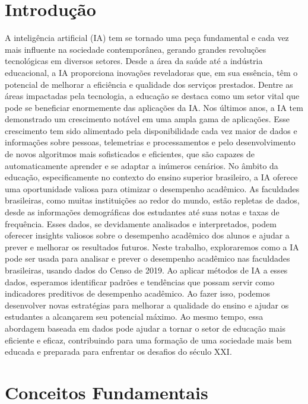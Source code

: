 \documentclass[conference]{IEEEtran}
\begin{document}
\section{Introdução}
A inteligência artificial (IA) tem se tornado uma peça fundamental e cada vez mais influente na sociedade contemporânea, gerando grandes revoluções tecnológicas em diversos setores. Desde a área da saúde até a indústria educacional, a IA proporciona inovações reveladoras que, em sua essência, têm o potencial de melhorar a eficiência e qualidade dos serviços prestados. Dentre as áreas impactadas pela tecnologia, a educação se destaca como um setor vital que pode se beneficiar enormemente das aplicações da IA.
Nos últimos anos, a IA tem demonstrado um crescimento notável em uma ampla gama de aplicações. Esse crescimento tem sido alimentado pela disponibilidade cada vez maior de dados e informações sobre pessoas, telemetrias e processamentos e pelo desenvolvimento de novos algoritmos mais sofisticados e eficientes, que são capazes de automaticamente aprender e se adaptar a inúmeros cenários.
No âmbito da educação, especificamente no contexto do ensino superior brasileiro, a IA oferece uma oportunidade valiosa para otimizar o desempenho acadêmico. As faculdades brasileiras, como muitas instituições ao redor do mundo, estão repletas de dados, desde as informações demográficas dos estudantes até suas notas e taxas de frequência. Esses dados, se devidamente analisados e interpretados, podem oferecer insights valiosos  sobre o desempenho acadêmico dos alunos e ajudar a prever e melhorar os resultados futuros.
Neste trabalho, exploraremos como a IA pode ser usada para analisar e prever o desempenho acadêmico nas faculdades brasileiras, usando dados do Censo de 2019. Ao aplicar métodos de IA a esses dados, esperamos identificar padrões e tendências que possam servir como indicadores preditivos de desempenho acadêmico. Ao fazer isso, podemos desenvolver novas estratégias para melhorar a qualidade do ensino e ajudar os estudantes a alcançarem seu potencial máximo. Ao mesmo tempo, essa abordagem baseada em dados pode ajudar a tornar o setor de educação mais eficiente e eficaz, contribuindo para uma formação de uma sociedade mais bem educada e preparada para enfrentar os desafios do século XXI.



\section{Conceitos Fundamentais}
\end{document}
